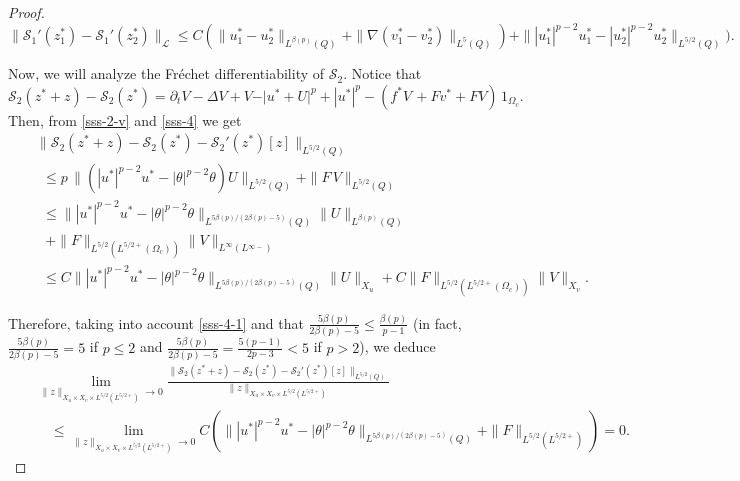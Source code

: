 \documentclass[10pt,a4paper]{amsart}
\begin{document}
\begin{proof}
$$
\| \mathcal{S}_1'(z_1^*)-\mathcal{S}_1'(z_2^*)\|_{ \mathcal{L} }%
\le C(\| u_1^*-u_2^*\|_{L^{\beta(p)}(Q)} + \| \nabla (v_1^*-v_2^*) \|_{L ^{5}(Q)})
+ \| |u_1^*|^{p-2}u_1^*-|u_2^*|^{p-2}u_2^* \|_{L^{5/2}(Q)}).
$$


Now, we will analyze the Fr\'echet differentiability of $\mathcal{S}_2$. Notice that
$$
\mathcal{S}_2(z^*+z)-\mathcal{S}_2(z^*)
=\partial_t V-\Delta V+ V -
\vert u^*+U \vert^{p} 
+|u^*|^p - (f^* V\,+ F v^* + F V)\,1_{\Omega_c}.
$$
Then, 
from \eqref{sss-2-v} and \eqref{sss-4} we get
%
\begin{eqnarray*}
&&\|\mathcal{S}_2(z^*+z)-\mathcal{S}_2(z^*)-\mathcal{S}_2'(z^*)[z]\|_{L^{ 5/2}(Q)}\\
&&\ \ \le 
p\, \| ( |u^*|^{p-2} u^* -|\theta|^{p-2}\theta)U\|_{L^{ 5/2}(Q)} + \| F \, V\|_{L^{ 5/2}(Q)}\\
&&\ \ \le  \||u^*|^{p-2} u^* -|\theta|^{p-2}\theta\|_{L^{5\beta(p)/(2\beta(p)-5)}(Q)}
\|U\|_{L^{ \beta(p)}(Q)}\\
&&\ \ \ +   \| F \|_{L^{5/2}(L^{5/2+}(\Omega_c))}\|V\|_{L^\infty(L{^{\infty-}})}\\
&&\ \ \le C  \||u^*|^{p-2} u^* -|\theta|^{p-2}\theta\|_{L^{5\beta(p)/(2\beta(p)-5)}(Q)}\|U\|_{X_u}+ C\| F \|_{L^{5/2}(L^{5/2+}(\Omega_c))}\|V\|_{X_v}.
\end{eqnarray*}


Therefore,  taking into account \eqref{sss-4-1}  and that $\frac{5\beta(p)}{2\beta(p)-5}\le \frac{\beta(p)}{p-1}$
(in fact, $\frac{5\beta(p)}{2\beta(p)-5}=5$ if $p\le2$ and $\frac{5\beta(p)}{2\beta(p)-5}=\frac{5(p-1)}{2p-3}<5$ if $p>2$),
we deduce
\begin{eqnarray*}
&&\lim_{\|z \|_{{X}_{ u}\times{X}_{v}
\times L^{5/2}(L^{5/2+})} \to 0}
\frac{\|\mathcal{S}_2(z^*+z)-\mathcal{S}_2(z^*)-\mathcal{S}_2'(z^*)[z]\|_{L^{ 5/2}(Q)}}
{\|z \|_{{X}_{u}\times{X}_{v} \times L^{5/2}(L^{5/2+})}}\\
&&
\quad \le \lim_{\| z \|_{{X}_{u}\times{X}_{v} \times L^{5/2}(L^{5/2+})} \to0}
C \left( \| |u^*|^{p-2} u^* -|\theta|^{p-2}\theta\|_{L^{5\beta(p)/(2\beta(p)-5)}(Q)} +  \| F \|_{L^{5/2}(L^{5/2+})} \right)=0.
\end{eqnarray*}


\end{proof}
\end{document}
